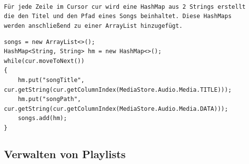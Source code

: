 \documentclass[FIPLY_base.tex]{subfiles}
\begin{document}
\ \\
\texttt{Für jede Zeile im Cursor cur wird eine HashMap aus 2 Strings erstellt die den Titel und den Pfad eines Songs beinhaltet. Diese HashMaps werden anschließend zu einer ArrayList hinzugefügt.}
\begin{lstlisting}
songs = new ArrayList<>();
HashMap<String, String> hm = new HashMap<>();
while(cur.moveToNext())
{
	hm.put("songTitle", cur.getString(cur.getColumnIndex(MediaStore.Audio.Media.TITLE)));
	hm.put("songPath", cur.getString(cur.getColumnIndex(MediaStore.Audio.Media.DATA)));
	songs.add(hm);
}
\end{lstlisting}




\subsection {Verwalten von Playlists}
\end{document}
